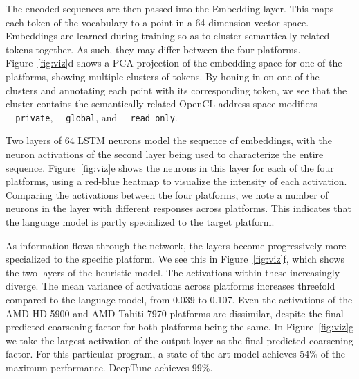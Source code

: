 The encoded sequences are then passed into the Embedding layer. This maps each token of the vocabulary to a point in a 64 dimension vector space. Embeddings are learned during training so as to cluster semantically related tokens together. As such, they may differ between the four platforms. Figure~\ref{fig:viz}d shows a PCA projection of the embedding space for one of the platforms, showing multiple clusters of tokens. By honing in on one of the clusters and annotating each point with its corresponding token, we see that the cluster contains the semantically related OpenCL address space modifiers \texttt{\_\_private}, \texttt{\_\_global}, and \texttt{\_\_read\_only}.

Two layers of 64 LSTM neurons model the sequence of embeddings, with the neuron activations of the second layer being used to characterize the entire sequence. Figure~\ref{fig:viz}e shows the neurons in this layer for each of the four platforms, using a red-blue heatmap to visualize the intensity of each activation. Comparing the activations between the four platforms, we note a number of neurons in the layer with different responses across platforms. This indicates that the language model is partly specialized to the target platform.

As information flows through the network, the layers become progressively more specialized to the specific platform. We see this in Figure~\ref{fig:viz}f, which shows the two layers of the heuristic model. The activations within these increasingly diverge. The mean variance of activations across platforms increases threefold compared to the language model, from 0.039 to 0.107. Even the activations of the AMD HD 5900 and AMD Tahiti 7970 platforms are dissimilar, despite the final predicted coarsening factor for both platforms being the same. In Figure~\ref{fig:viz}g we take the largest activation of the output layer as the final predicted coarsening factor. For this particular program, a state-of-the-art model achieves 54\% of the maximum performance. DeepTune achieves 99\%.
